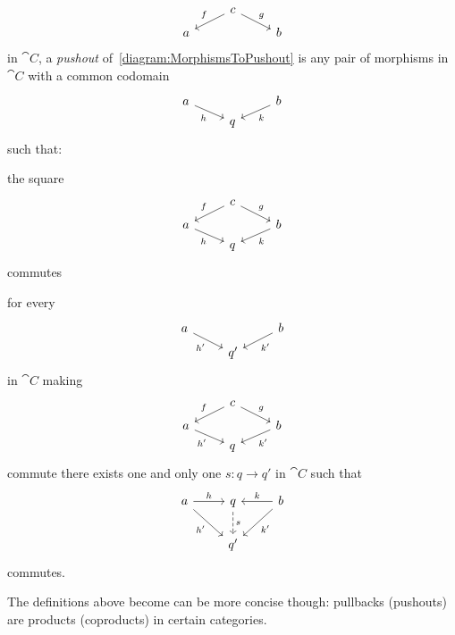 \begin{definition}
\begin{equation}
\begin{tikzcd}[row sep=tiny]
& c \ar["f", dl, swap] \ar["g", dr] & \\
a & & b
\end{tikzcd}
\label{diagram:MorphismsToPushout}\end{equation}
in \(\cat C\), a {\em pushout} of~\eqref{diagram:MorphismsToPushout} is any pair of morphisms in \(\cat C\) with a common codomain
\[\begin{tikzcd}[row sep=tiny]
a \ar["h", dr, swap] & & b \ar["k", dl] \\
& q &
\end{tikzcd}\]
such that:
\begin{tcbitem}
\item the square
\[\begin{tikzcd}[row sep=tiny]
                     & c \ar["f", dl, swap] \ar["g", dr] &                \\
a \ar["h", dr, swap] &                                   & b \ar["k", dl] \\
                     & q                                 &
\end{tikzcd}\]
commutes
\item for every
\[\begin{tikzcd}[row sep=tiny]
a \ar["{h'}", dr, swap] & & b \ar["{k'}", dl] \\
& q' &
\end{tikzcd}\]
in \(\cat C\)
making
\[\begin{tikzcd}[row sep=tiny]
                     & c \ar["f", dl, swap] \ar["g", dr] &                \\
a \ar["{h'}", dr, swap] &                                   & b \ar["{k'}", dl] \\
                     & q                                 &
\end{tikzcd}\]
commute there exists one and only one \(s : q \to q'\) in \(\cat C\) such that
\[\begin{tikzcd}
a \ar["h", r] \ar["{h'}", dr, swap] & q \ar["s", d, dashed] & b \ar["k", l, swap] \ar["{k'}", dl] \\
& q' &
\end{tikzcd}\]
commutes.
\end{tcbitem}
\end{definition}

The definitions above become can be more concise though: pullbacks (pushouts) are products (coproducts) in certain categories.


